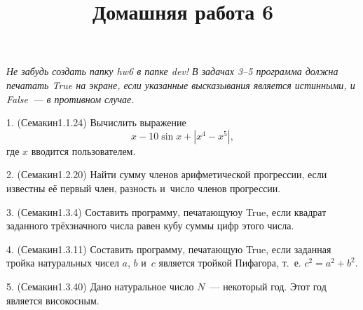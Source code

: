 \documentclass[12pt,russian,draft]{article}
\title{Домашняя работа 6}
\date{}
\begin{document}
\maketitle{}

\emph{Не забудь создать папку hw6 в папке dev! В задачах 3--5 программа должна
    печатать True на экране, если указанные высказывания является истинными, и
    False~--- в противном случае.}

1. (Семакин1.1.24) Вычислить выражение
\[
    x - 10 \sin x + |x^4 - x^5|,
\]
где $x$ вводится пользователем.

2. (Семакин1.2.20) Найти сумму членов арифметической прогрессии, если известны
её первый член, разность и~число членов прогрессии. 

3. (Семакин1.3.4) Составить программу, печатающуюу True, если квадрат заданного
трёхзначного числа равен кубу суммы цифр этого числа.

4. (Семакин1.3.11) Составить программу, печатающую True, если заданная тройка
на\-ту\-раль\-ных чисел $a$, $b$ и~$c$ является тройкой Пифагора, т.~е. $ c^2
= a^2 + b^2 $.

5. (Семакин1.3.40) Дано натуральное число $N$~--- некоторый год. Этот год
является високосным.
\end{document}
